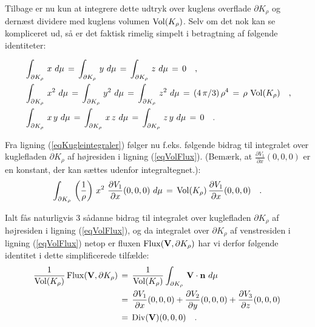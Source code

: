 \begin{bevis}
Tilbage er nu kun at integrere dette udtryk over
kuglens overflade $\partial K_{\rho}$ og dernæst
dividere med kuglens volumen $\operatorname{Vol}(K_{\rho})$.
Selv om det nok kan se kompliceret ud, så er det
faktisk rimelig simpelt i betragtning af følgende
identiteter:

\begin{equation} \label{eqKugleintegraler}
\begin{aligned}
&\int_{\partial K_{\rho}}\,x \,\,d\mu \, = \,
\int_{\partial K_{\rho}}\,y \,\,d\mu \, = \,
\int_{\partial K_{\rho}}\,z \,\,d\mu \, = \,0 \quad , \\
&\int_{\partial K_{\rho}}\,x^{2}\,\, d\mu \, = \,
\int_{\partial K_{\rho}}\,y^{2}\,\, d\mu \, = \,
\int_{\partial K_{\rho}}\,z^{2}\,\, d\mu \, = \, (4\,\pi/3)\,\rho^{4}\, = \, \rho\,\operatorname{Vol}(K_{\rho})\quad , \\
& \int_{\partial K_{\rho}}\,x\,y \,\,d\mu \, = \,
\int_{\partial K_{\rho}}\,x\,z \,\,d\mu \, =
\,\int_{\partial K_{\rho}}\,z\,y \,\,d\mu \, =
\,0 \quad .
\end{aligned}
\end{equation}



Fra ligning (\ref{eqKugleintegraler}) følger nu
f.eks. følgende bidrag til integralet over
kuglefladen $\partial K_{\rho}$ af
høj\-re\-si\-den i ligning (\ref{eqVolFlux}).
(Bemærk, at $\frac{\partial V_{1}}{\partial
x}(0,0,0)$ er en konstant, der kan sættes udenfor
integraltegnet.):
\begin{equation}
\int_{\partial
K_{\rho}}\,\left(\frac{1}{\rho}\right)\,x^{2}\,\,\frac{\partial
V_{1}}{\partial x}(0,0,0)\,\, d\mu \, = \,
\operatorname{Vol}(K_{\rho})\,\frac{\partial V_{1}}{\partial
x}(0,0,0) \quad .
\end{equation}

Ialt fås naturligvis 3 sådanne bidrag til
integralet over kuglefladen $\partial K_{\rho}$
af høj\-re\-si\-den i ligning (\ref{eqVolFlux}),
og da integralet over $\partial K_{\rho}$
 af venstresiden i ligning (\ref{eqVolFlux}) netop er fluxen $\operatorname{Flux}({\bf{V}},
 \partial K_{\rho})$ har vi derfor følgende
 identitet i dette simplificerede tilfælde:
\begin{equation} \label{eqLimitDiv}
\begin{aligned}
\frac{1}{\operatorname{Vol}(K_{\rho})}\operatorname{Flux}({\bf{V}}, \partial K_{\rho})
\, &= \,
\frac{1}{\operatorname{Vol}(K_{\rho})}\int_{\partial K_{\rho}}\,{\bf{V}}\cdot
{\bf{n}} \,\,d\mu \, \\
&= \, \frac{\partial V_{1}}{\partial x}(0,0,0) +
\frac{\partial V_{2}}{\partial y}(0,0,0) +
\frac{\partial V_{3}}{\partial z}(0,0,0) \, \\ &
= \, \operatorname{Div}({\bf{V}})(0,0,0) \quad .
\end{aligned}
\end{equation}



\end{bevis}
